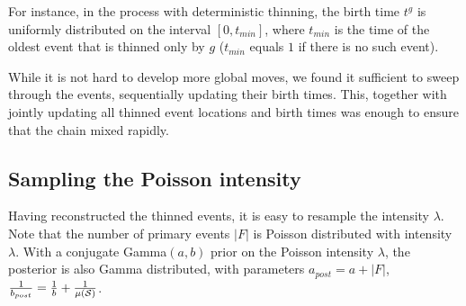 \documentclass{statsoc}
\begin{document}
For instance, in the \matern process with deterministic thinning, %
the birth time $t^g$ is uniformly distributed on the interval $[0, t_{min}]$, 
where $t_{min}$ is the time of the oldest event that is thinned only by $g$ ($t_{min}$ equals $1$ if there is no
such event). 

While it is not hard to develop more global moves, we found it sufficient to sweep through the \matern events, 
sequentially updating their birth times. This, together with jointly updating all thinned event locations and birth times was 
enough to ensure that the chain mixed rapidly. 


\subsection{Sampling the Poisson intensity} \label{sec:Poiss_int_inf}
Having reconstructed the thinned events, it is easy to resample the intensity  $\lambda$.
Note that the number of primary events $|F|$ is Poisson distributed with intensity $\lambda$. 
With a conjugate Gamma$(a,b)$ prior on the Poisson intensity $\lambda$, %
the posterior is also Gamma distributed, with parameters %
$a_{post} = a + |F|$,
$\frac{1}{b_{post}} = \frac{1}{b} + \frac{1}{\mu({\mathcal S})}$. %
\end{document}
